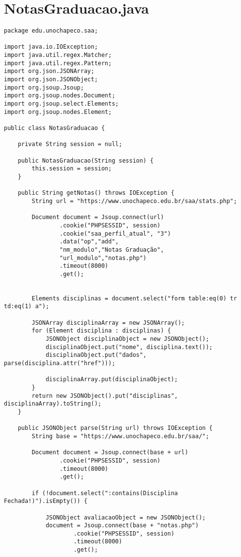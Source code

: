 \section{NotasGraduacao.java}
\begin{lstlisting}
package edu.unochapeco.saa;

import java.io.IOException;
import java.util.regex.Matcher;
import java.util.regex.Pattern;
import org.json.JSONArray;
import org.json.JSONObject;
import org.jsoup.Jsoup;
import org.jsoup.nodes.Document;
import org.jsoup.select.Elements;
import org.jsoup.nodes.Element;

public class NotasGraduacao {

    private String session = null;

    public NotasGraduacao(String session) {
        this.session = session;
    }

    public String getNotas() throws IOException {
        String url = "https://www.unochapeco.edu.br/saa/stats.php";

        Document document = Jsoup.connect(url)
                .cookie("PHPSESSID", session)
                .cookie("saa_perfil_atual", "3")
                .data("op","add",
                "nm_modulo","Notas Graduação",
                "url_modulo","notas.php")
                .timeout(8000)
                .get();

       
        Elements disciplinas = document.select("form table:eq(0) tr td:eq(1) a");

        JSONArray disciplinaArray = new JSONArray();
        for (Element disciplina : disciplinas) {
            JSONObject disciplinaObject = new JSONObject();
            disciplinaObject.put("nome", disciplina.text());
            disciplinaObject.put("dados", parse(disciplina.attr("href")));

            disciplinaArray.put(disciplinaObject);
        }
        return new JSONObject().put("disciplinas", disciplinaArray).toString();
    }

    public JSONObject parse(String url) throws IOException {
        String base = "https://www.unochapeco.edu.br/saa/";

        Document document = Jsoup.connect(base + url)
                .cookie("PHPSESSID", session)
                .timeout(8000)
                .get();

        if (!document.select(":contains(Disciplina Fechada!)").isEmpty()) {

            JSONObject avaliacaoObject = new JSONObject();
            document = Jsoup.connect(base + "notas.php")
                    .cookie("PHPSESSID", session)
                    .timeout(8000)
                    .get();


\end{lstlisting}
